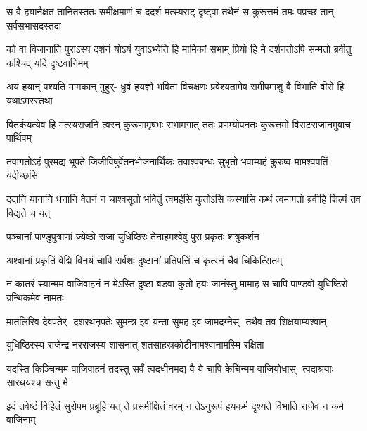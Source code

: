 \fourlineindentedshloka
{स वै हयानैक्षत तानितस्ततः}
{समीक्षमाणं च ददर्श मत्स्यराट्}
{दृष्ट्वा तथैनं स कुरूत्तमं तमः}
{पप्रच्छ तान् सर्वसभासदस्तदा}


\fourlineindentedshloka
{को वा विजानाति पुराऽस्य दर्शनं}
{योऽयं युवाऽभ्येति हि मामिकां सभाम्}
{प्रियो हि मे दर्शनतोऽपि सम्मतो}
{ब्रवीतु कश्चिद् यदि दृष्टवानिमम्}


\fourlineindentedshloka
{अयं हयान् पश्यति मामकान् मुहुर्-}
{ध्रुवं हयज्ञो भविता विचक्षणः}
{प्रवेश्यतामेष समीपमाशु वै}
{विभाति वीरो हि यथाऽमरस्तथा}


\fourlineindentedshloka
{वितर्कयत्येव हि मत्स्यराजनि}
{त्वरन् कुरूणामृषभः सभामगात्}
{ततः प्रणम्योपनतः कुरूत्तमो}
{विराटराजानमुवाच पार्थिवम्}


\fourlineindentedshloka
{तवागतोऽहं पुरमद्य भूपते}
{जिजीविषुर्वेतनभोजनार्थिकः}
{तवाश्वबन्धः सुभृतो भवाम्यहं}
{कुरुष्व मामश्वपतिं यदीच्छसि}




\fourlineindentedshloka
{ददानि यानानि धनानि वेतनं}
{न चाश्वसूतो भवितुं त्वमर्हसि}
{कुतोऽसि कस्यासि कथं त्वमागतो}
{ब्रवीहि शिल्पं तव विद्यते च यत्}




\twolineshloka
{पञ्चानां पाण्डुपुत्राणां ज्येष्ठो राजा युधिष्ठिरः}
{तेनाहमश्वेषु पुरा प्रकृतः शत्रुकर्शन}


\twolineshloka
{अश्वानां प्रकृतिं वेद्मि विनयं चापि सर्वशः}
{दुष्टानां प्रतिपत्तिं च कृत्स्नं चैव चिकित्सितम्}


\fourlineindentedshloka
{न कातरं स्यान्मम वाजिवाहनं}
{न मेऽस्ति दुष्टा बडवा कुतो हयः}
{जानंस्तु मामाह स चापि पाण्डवो}
{युधिष्ठिरो ग्रन्थिकमेव नामतः}


\fourlineindentedshloka
{मातलिरिव देवपतेर्-}
{दशरथनृपतेः सुमन्त्र इव यन्ता}
{सुमह इव जामदग्नेस्-}
{तथैव तव शिक्षयाम्यश्वान्}


\twolineshloka
{युधिष्ठिरस्य राजेन्द्र नरराजस्य शासनात्}
{शतसाहस्रकोटीनामश्वानामस्मि रक्षिता}




\fourlineindentedshloka
{यदस्ति किञ्चिन्मम वाजिवाहनं}
{तदस्तु सर्वं त्वदधीनमद्य वै}
{ये चापि केचिन्मम वाजियोधास्-}
{त्वदाश्रयाः सारथयश्च सन्तु मे}


\fourlineindentedshloka
{इदं तवेष्टं विहितं सुरोपम}
{प्रब्रूहि यत् ते प्रसमीक्षितं वरम्}
{न तेऽनुरूपं हयकर्म दृश्यते}
{विभाति राजेव न कर्म वाजिनाम्}


